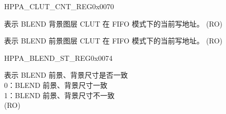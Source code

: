 \begin{register}{H}{PPA\_CLUT\_CNT\_REG}{0x0070}\label{regdesc:PPACLUTCNTREG}
%
%
%
\regnewline%
\begin{regdesc}\begin{reglist}
\label{fielddesc:PPABLEND0CLUTCNT}\item [PPA\_BLEND0\_CLUT\_CNT] 表示 BLEND 背景图层 CLUT 在 FIFO 模式下的当前写地址。 (RO)
\label{fielddesc:PPABLEND1CLUTCNT}\item [PPA\_BLEND1\_CLUT\_CNT] 表示 BLEND 前景图层 CLUT 在 FIFO 模式下的当前写地址。 (RO)
\end{reglist}\end{regdesc}
\end{register}


\begin{register}{H}{PPA\_BLEND\_ST\_REG}{0x0074}\label{regdesc:PPABLENDSTREG}
%
%
\regnewline%
\begin{regdesc}\begin{reglist}
\label{fielddesc:PPABLENDSIZEDIFFST}\item [PPA\_BLEND\_SIZE\_DIFF\_ST] 表示 BLEND 前景、背景尺寸是否一致\\
0：BLEND 前景、背景尺寸一致\\
1：BLEND 前景、背景尺寸不一致\\
(RO)
\end{reglist}\end{regdesc}
\end{register}


